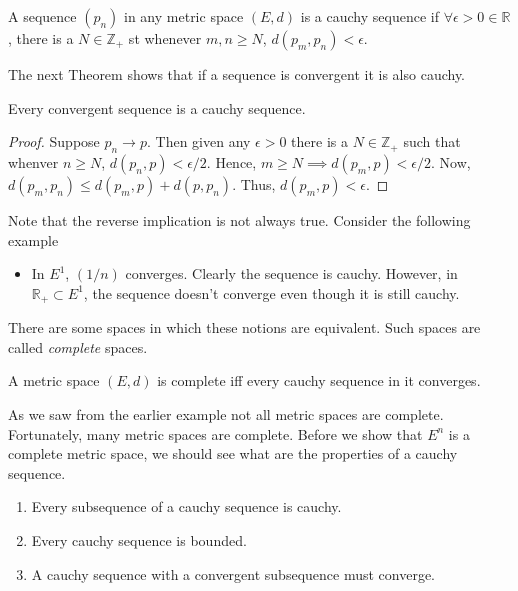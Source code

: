 \begin{Definition}
    A sequence $\left(p_n\right)$ in any metric space $(E,d)$ is a cauchy sequence if $\forall
    \epsilon > 0 \in \mathbb{R}$, there is a $N \in \mathbb{Z}_+$ st whenever $m,n \geq N$,
    $d(p_m,p_n) < \epsilon$.
\end{Definition}
The next Theorem shows that if a sequence is convergent it is also cauchy.
\begin{Theorem}[name=Convergent sequences are cauchy]
    Every convergent sequence is a cauchy sequence.
\end{Theorem}
\begin{proof}
    Suppose $p_n \rightarrow p$. Then given any $\epsilon > 0$ there is a $N \in \mathbb{Z}_+$ such
that whenver $n \geq N$, $d(p_n,p) < \epsilon/2$. Hence, $m \geq N \implies d(p_m,p) < \epsilon/2$. 
Now, $d(p_m,p_n) \leq d(p_m,p) + d(p,p_n)$. Thus, $d(p_m,p) < \epsilon$.
\end{proof}
Note that the reverse implication is not always true. Consider the following example
\begin{itemize}
    \item In $E^1$, $\left(1/n\right)$ converges. Clearly the sequence is cauchy. However, in
	$\mathbb{R}_+ \subset E^1$, the sequence doesn't converge even though it is still cauchy.
\end{itemize}
There are some spaces in which these notions are equivalent. Such spaces are called \emph{complete}
spaces.
\begin{Definition}
    A metric space $(E,d)$ is complete iff every cauchy sequence in it converges. 
\end{Definition}
As we saw from the earlier example not all metric spaces are complete. Fortunately, many metric
spaces are complete. Before we show that $E^n$ is a complete metric space, we should see what are
the properties of a cauchy sequence.
\begin{Proposition}[name=Properties of a cauchy sequence]

    \begin{enumerate}
	\item Every subsequence of a cauchy sequence is cauchy.
	\item Every cauchy sequence is bounded.
	\item A cauchy sequence with a convergent subsequence must converge.
    \end{enumerate}
\end{Proposition}

